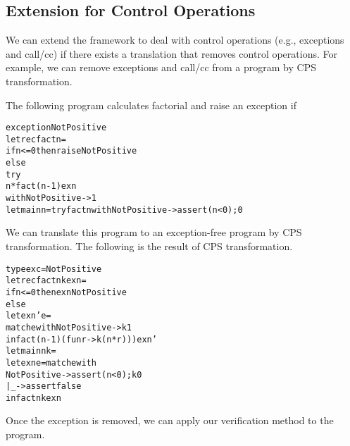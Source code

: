 \subsection{Extension for Control Operations}
\label{sec:control}
We can extend the framework to deal with control operations (e.g., exceptions and call/cc) if there
exists a translation that removes control operations.  For example,
we can remove exceptions and call/cc from a program by CPS transformation.

\begin{example}
The following program calculates factorial and raise an exception if
\begin{alltt}
exception NotPositive
let rec fact n =
  if n <= 0 then raise NotPositive
  else
    try
      n * fact (n - 1) exn
    with NotPositive -> 1
let main n = try fact n with NotPositive -> assert (n < 0); 0
\end{alltt}
We can translate this program to an exception-free program by CPS transformation.
The following is the result of CPS transformation.
\begin{alltt}
type exc = NotPositive
let rec fact n k exn =
  if n <= 0 then exn NotPositive
  else
    let exn' e =
      match e with NotPositive -> k 1
    in fact (n - 1) (fun r -> k (n * r))) exn'
let main n k =
  let exn e = match e with
                  NotPositive -> assert (n < 0); k 0
                | _ -> assert false
  in fact n k exn
\end{alltt}
Once the exception is removed, we can apply our verification method to the
program.
\end{example}

